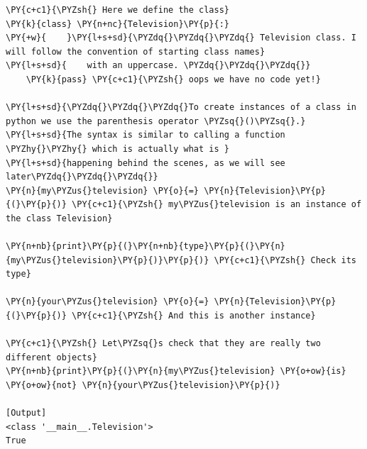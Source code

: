 \begin{Verbatim}[label=\makebox{\url{https://github.com/lucabaldini/cmepda/tree/master/slides/latex/snippets/class\_tv\_basic.py}},commandchars=\\\{\}]
\PY{c+c1}{\PYZsh{} Here we define the class}
\PY{k}{class} \PY{n+nc}{Television}\PY{p}{:}
\PY{+w}{    }\PY{l+s+sd}{\PYZdq{}\PYZdq{}\PYZdq{} Television class. I will follow the convention of starting class names}
\PY{l+s+sd}{    with an uppercase. \PYZdq{}\PYZdq{}\PYZdq{}}
    \PY{k}{pass} \PY{c+c1}{\PYZsh{} oops we have no code yet!}

\PY{l+s+sd}{\PYZdq{}\PYZdq{}\PYZdq{}To create instances of a class in python we use the parenthesis operator \PYZsq{}()\PYZsq{}.}
\PY{l+s+sd}{The syntax is similar to calling a function \PYZhy{}\PYZhy{} which is actually what is }
\PY{l+s+sd}{happening behind the scenes, as we will see later\PYZdq{}\PYZdq{}\PYZdq{}}
\PY{n}{my\PYZus{}television} \PY{o}{=} \PY{n}{Television}\PY{p}{(}\PY{p}{)} \PY{c+c1}{\PYZsh{} my\PYZus{}television is an instance of the class Television}

\PY{n+nb}{print}\PY{p}{(}\PY{n+nb}{type}\PY{p}{(}\PY{n}{my\PYZus{}television}\PY{p}{)}\PY{p}{)} \PY{c+c1}{\PYZsh{} Check its type}

\PY{n}{your\PYZus{}television} \PY{o}{=} \PY{n}{Television}\PY{p}{(}\PY{p}{)} \PY{c+c1}{\PYZsh{} And this is another instance}

\PY{c+c1}{\PYZsh{} Let\PYZsq{}s check that they are really two different objects}
\PY{n+nb}{print}\PY{p}{(}\PY{n}{my\PYZus{}television} \PY{o+ow}{is} \PY{o+ow}{not} \PY{n}{your\PYZus{}television}\PY{p}{)}

[Output]
<class '__main__.Television'>
True
\end{Verbatim}